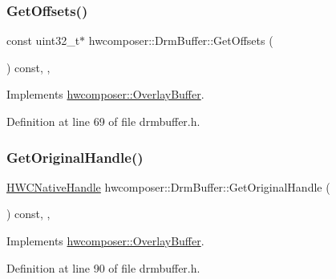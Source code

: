 \subsubsection{\texorpdfstring{Get\+Offsets()}{GetOffsets()}}
{\footnotesize\ttfamily const uint32\+\_\+t$\ast$ hwcomposer\+::\+Drm\+Buffer\+::\+Get\+Offsets (\begin{DoxyParamCaption}{ }\end{DoxyParamCaption}) const\hspace{0.3cm}{\ttfamily [inline]}, {\ttfamily [override]}, {\ttfamily [virtual]}}



Implements \mbox{\hyperlink{classhwcomposer_1_1OverlayBuffer_ab2ebf4c92de3d7ad57f108871fa58d24}{hwcomposer\+::\+Overlay\+Buffer}}.



Definition at line 69 of file drmbuffer.\+h.


\begin{DoxyCode}{0}
\end{DoxyCode}
\mbox{\label{classhwcomposer_1_1DrmBuffer_a66a876cebee293bc84bf0dc6edd35f0c}} 
\subsubsection{\texorpdfstring{Get\+Original\+Handle()}{GetOriginalHandle()}}
{\footnotesize\ttfamily \mbox{\hyperlink{alios_2platformdefines_8h_ac0a2eaf260f556d17fe489911f017bdf}{H\+W\+C\+Native\+Handle}} hwcomposer\+::\+Drm\+Buffer\+::\+Get\+Original\+Handle (\begin{DoxyParamCaption}{ }\end{DoxyParamCaption}) const\hspace{0.3cm}{\ttfamily [inline]}, {\ttfamily [override]}, {\ttfamily [virtual]}}



Implements \mbox{\hyperlink{classhwcomposer_1_1OverlayBuffer_a29ba52c586290b087991e195212c53f2}{hwcomposer\+::\+Overlay\+Buffer}}.



Definition at line 90 of file drmbuffer.\+h.


